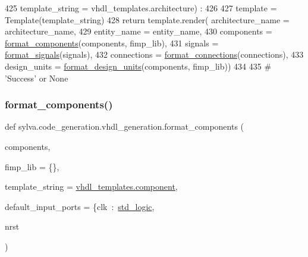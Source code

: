 \begin{DoxyCode}
425   template\_string = vhdl\_templates.architecture) :
426 
427   template = Template(template\_string)
428   \textcolor{keywordflow}{return} template.render( architecture\_name = architecture\_name,
429                      entity\_name = entity\_name,
430                      components = \hyperlink{namespacesylva_1_1code__generation_1_1vhdl__generation_a82d14f967dd9f7e059172186c5b49411}{format\_components}(components, fimp\_lib),
431                      signals = \hyperlink{namespacesylva_1_1code__generation_1_1vhdl__generation_a8d3a2a6fdc4ce4af07672a2dd237a75d}{format\_signals}(signals),
432                      connections = \hyperlink{namespacesylva_1_1code__generation_1_1vhdl__generation_a11710d670da0bd9d0787c3d56fd484c7}{format\_connections}(connections),
433                      design\_units = \hyperlink{namespacesylva_1_1code__generation_1_1vhdl__generation_a220526068f8d3f59852470bc1879f019}{format\_design\_units}(components, fimp\_lib))
434 
435 \textcolor{comment}{# 'Success' or None}
\end{DoxyCode}
\mbox{\label{namespacesylva_1_1code__generation_1_1vhdl__generation_a82d14f967dd9f7e059172186c5b49411}} 
\subsubsection{\texorpdfstring{format\+\_\+components()}{format\_components()}}
{\footnotesize\ttfamily def sylva.\+code\+\_\+generation.\+vhdl\+\_\+generation.\+format\+\_\+components (\begin{DoxyParamCaption}\item[{}]{components,  }\item[{}]{fimp\+\_\+lib = {\ttfamily \{\}},  }\item[{}]{template\+\_\+string = {\ttfamily \hyperlink{namespacesylva_1_1code__generation_1_1vhdl__templates_a65130034af5ea62c012dd84afaedcc34}{vhdl\+\_\+templates.\+component}},  }\item[{}]{default\+\_\+input\+\_\+ports = {\ttfamily \{\textquotesingle{}clk\textquotesingle{}~\+:~\textquotesingle{}\hyperlink{namespacesylva_1_1code__generation_1_1vhdl__generation_a85e74939ca684a8a978805b5918467c8}{std\+\_\+logic}\textquotesingle{}},  }\item[{}]{nrst }\end{DoxyParamCaption})}



